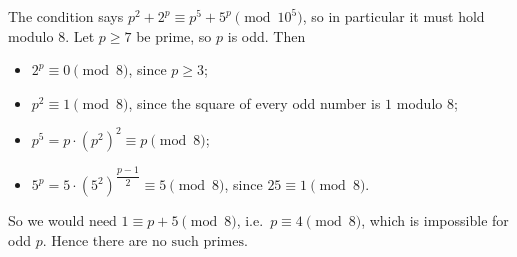 The condition says $p^2+2^p\equiv p^5+5^p\pmod{10^5}$, so in particular it must hold modulo $8$. Let $p\ge7$ be prime, so $p$ is odd. Then
\begin{itemize}
\item $2^p\equiv0\pmod8$, since $p\ge3$;
\item $p^2\equiv1\pmod8$, since the square of every odd number is $1$ modulo $8$;
\item $p^5=p\cdot\left(p^2\right)^2\equiv p\pmod8$;
\item $5^p=5\cdot\left(5^2\right)^{\dfrac{p-1}{2}}\equiv5\pmod8$, since $25\equiv1\pmod8$.
\end{itemize}
So we would need $1\equiv p+5\pmod8$, i.e.\ $p\equiv4\pmod8$, which is impossible for odd $p$. Hence there are $\boxed{\text{no such primes}}$.

